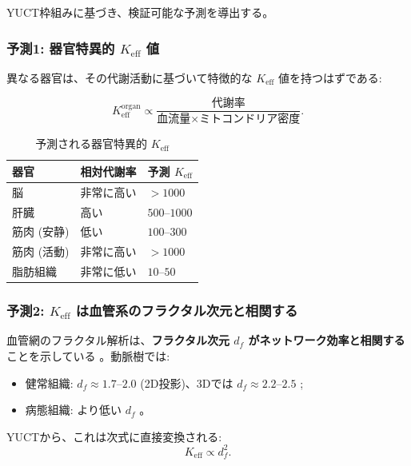 \documentclass[12pt]{article}
\newcommand{\Keff}{K_{\mathrm{eff}}}
\begin{document}
	YUCT枠組みに基づき、検証可能な予測を導出する。
	
	\subsubsection{予測1: 器官特異的 \(\Keff\) 値}
	
	異なる器官は、その代謝活動に基づいて特徴的な \(\Keff\) 値を持つはずである:
	
	\begin{equation}
		\Keff^{\text{organ}} \propto \frac{\text{代謝率}}{\text{血流量} \times \text{ミトコンドリア密度}}.
	\end{equation}
	
	\begin{table}[htbp]
		\centering
		\caption{予測される器官特異的 \(K_{\mathrm{eff}}\)}
		\label{tab:organ-keff}
		\footnotesize
		\begin{tabular}{p{3cm} p{3cm} p{3cm}}
			\toprule
			\textbf{器官} & \textbf{相対代謝率} & \textbf{予測 \(K_{\mathrm{eff}}\)} \\
			\midrule
			脳      & 非常に高い   & \(>1000\) \\
			肝臓      & 高い        & \(500\)–\(1000\) \\
			筋肉 (安静) & 低い     & \(100\)–\(300\) \\
			筋肉 (活動) & 非常に高い & \(>1000\) \\
			脂肪組織 & 非常に低い & \(10\)–\(50\) \\
			\bottomrule
		\end{tabular}
	\end{table}
	
	\subsubsection{予測2: \(\Keff\) は血管系のフラクタル次元と相関する}
	
	血管網のフラクタル解析は、\textbf{フラクタル次元 \(d_f\) がネットワーク効率と相関する} ことを示している \cite{Gould1993}。動脈樹では:
	\begin{itemize}
		\item 健常組織: \(d_f \approx 1.7\)–\(2.0\) (2D投影)、3Dでは \(d_f \approx 2.2\)–\(2.5\) \cite{Cross1993};
		\item 病態組織: より低い \(d_f\) \cite{Gould1993}。
	\end{itemize}
	YUCTから、これは次式に直接変換される:
	\begin{equation}
		\Keff \propto d_f^{2}.
	\end{equation}
	
\end{document}
